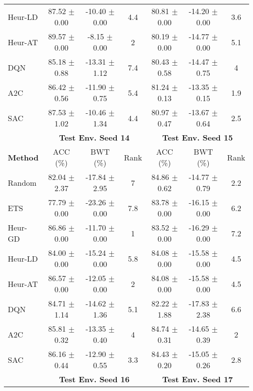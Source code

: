 \begin{tabular}{lcccccc}
	Heur-LD         & 87.52 $\pm$ 0.00    & -10.40 $\pm$ 0.00   & 4.4    & 80.81 $\pm$ 0.00    & -14.20 $\pm$ 0.00   & 3.6    \\
	Heur-AT         & 89.57 $\pm$ 0.00    & -8.15 $\pm$ 0.00    & 2      & 80.19 $\pm$ 0.00    & -14.77 $\pm$ 0.00   & 5.1    \\
	DQN             & 85.18 $\pm$ 0.88    & -13.31 $\pm$ 1.12   & 7.4    & 80.43 $\pm$ 0.58    & -14.47 $\pm$ 0.75   & 4      \\
	A2C             & 86.42 $\pm$ 0.56    & -11.90 $\pm$ 0.75   & 5.4    & 81.24 $\pm$ 0.13    & -13.35 $\pm$ 0.15   & 1.9    \\
	SAC             & 87.53 $\pm$ 1.02    & -10.46 $\pm$ 1.34   & 4.4    & 80.97 $\pm$ 0.47    & -13.67 $\pm$ 0.64   & 2.5    \\
	\midrule 
	& \multicolumn{3}{c}{\textbf{Test Env. Seed 14}} & \multicolumn{3}{c}{\textbf{Test Env. Seed 15}} \\
	\cmidrule(lr){2-4} \cmidrule(lr){5-7}
	\textbf{Method} & ACC (\%)          & BWT (\%)          & Rank   & ACC (\%)          & BWT (\%)          & Rank   \\
	\midrule 
	Random          & 82.04 $\pm$ 2.37    & -17.84 $\pm$ 2.95   & 7      & 84.86 $\pm$ 0.62    & -14.77 $\pm$ 0.79   & 2.2    \\
	ETS             & 77.79 $\pm$ 0.00    & -23.26 $\pm$ 0.00   & 7.8    & 83.78 $\pm$ 0.00    & -16.15 $\pm$ 0.00   & 6.2    \\
	Heur-GD         & 86.86 $\pm$ 0.00    & -11.70 $\pm$ 0.00   & 1      & 83.52 $\pm$ 0.00    & -16.29 $\pm$ 0.00   & 7.2    \\
	Heur-LD         & 84.00 $\pm$ 0.00    & -15.24 $\pm$ 0.00   & 5.8    & 84.08 $\pm$ 0.00    & -15.58 $\pm$ 0.00   & 4.5    \\
	Heur-AT         & 86.57 $\pm$ 0.00    & -12.05 $\pm$ 0.00   & 2      & 84.08 $\pm$ 0.00    & -15.58 $\pm$ 0.00   & 4.5    \\
	DQN             & 84.71 $\pm$ 1.14    & -14.62 $\pm$ 1.36   & 5.1    & 82.22 $\pm$ 1.88    & -17.83 $\pm$ 2.38   & 6.6    \\
	A2C             & 85.81 $\pm$ 0.32    & -13.35 $\pm$ 0.40   & 4      & 84.74 $\pm$ 0.31    & -14.65 $\pm$ 0.39   & 2      \\
	SAC             & 86.16 $\pm$ 0.44    & -12.90 $\pm$ 0.55   & 3.3    & 84.43 $\pm$ 0.20    & -15.05 $\pm$ 0.26   & 2.8    \\
	\midrule 
	& \multicolumn{3}{c}{\textbf{Test Env. Seed 16}} & \multicolumn{3}{c}{\textbf{Test Env. Seed 17}} \\

\end{tabular}
